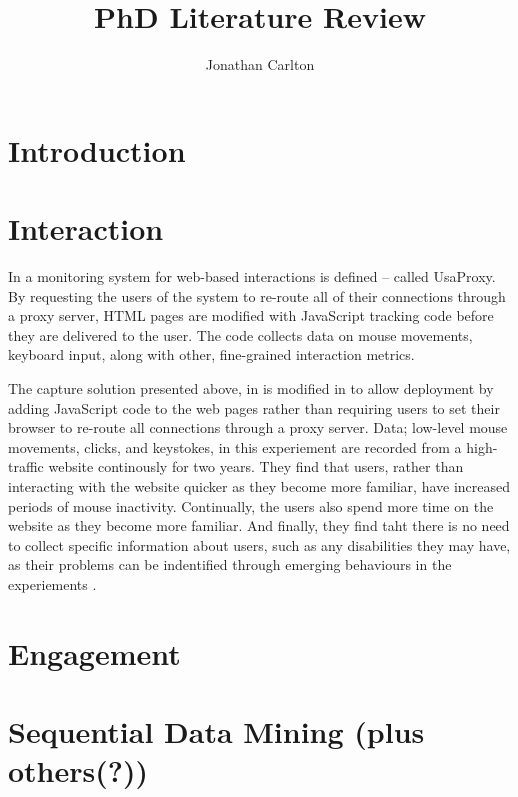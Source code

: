 \documentclass{llncs2e/llncs}
\title{PhD Literature Review}
\author{Jonathan Carlton}
\institute{School of Computer Science \\ University of Manchester \\
\email{jonathan.carlton@postgrad.manchester.ac.uk}
}
\begin{document}
  \maketitle

  \section{Introduction}

  \section{Interaction}
  In \cite{atterer2006knowing} a monitoring system for web-based interactions is
  defined -- called UsaProxy. By requesting the users of the system to re-route
  all of their connections through a proxy server, HTML pages are modified with
  JavaScript tracking code before they are delivered to the user. The code
  collects data on mouse movements, keyboard input, along with other,
  fine-grained interaction metrics.

  The capture solution presented above, in \cite{atterer2006knowing} is
  modified in \cite{apaolaza2015longitudinal} to allow deployment by adding
  JavaScript code to the web pages rather than requiring users to set their
  browser to re-route all connections through a proxy server. Data; low-level
  mouse movements, clicks, and keystokes, in this experiement are recorded from
  a high-traffic website continously for two years. They find that users, rather
  than interacting with the website quicker as they become more familiar, have
  increased periods of mouse inactivity. Continually, the users also spend
  more time on the website as they become more familiar. And finally, they
  find taht there is no need to collect specific information about users, such
  as any disabilities they may have, as their problems can be indentified through
  emerging behaviours in the experiements \cite{apaolaza2013understanding}.

  \section{Engagement}

  \section{Sequential Data Mining (plus others(?))}

  
  
\end{document}
